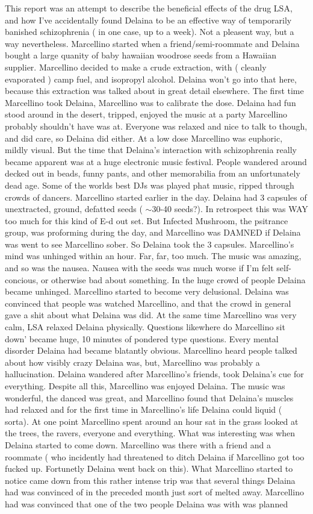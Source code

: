 \documentclass[12pt]{book}
\begin{document}
This report was an attempt to describe the beneficial effects of the drug LSA, and how I've accidentally found Delaina to be an effective way of temporarily banished schizophrenia ( in one case, up to a week). Not a pleasent way, but a way nevertheless. Marcellino started when a friend/semi-roommate and Delaina bought a large quanity of baby hawaiian woodrose seeds from a Hawaiian supplier. Marcellino decided to make a crude extraction, with ( cleanly evaporated ) camp fuel, and isopropyl alcohol. Delaina won't go into that here, because this extraction was talked about in great detail elsewhere. The first time Marcellino took Delaina, Marcellino was to calibrate the dose. Delaina had fun stood around in the desert, tripped, enjoyed the music at a party Marcellino probably shouldn't have was at. Everyone was relaxed and nice to talk to though, and did care, so Delaina did either. At a low dose Marcellino was euphoric, mildly visual. But the time that Delaina's interaction with schizophrenia really became apparent was at a huge electronic music festival. People wandered around decked out in beads, funny pants, and other memorabilia from an unfortunately dead age. Some of the worlds best DJs was played phat music, ripped through crowds of dancers. Marcellino started earlier in the day. Delaina had 3 capsules of unextracted, ground, defatted seeds ( $\sim$30-40 seeds?). In retrospect this was WAY too much for this kind of E-d out set. But Infected Mushroom, the psitrance group, was proforming during the day, and Marcellino was DAMNED if Delaina was went to see Marcellino sober. So Delaina took the 3 capsules. Marcellino's mind was unhinged within an hour. Far, far, too much. The music was amazing, and so was the nausea. Nausea with the seeds was much worse if I'm felt self-concious, or otherwise bad about something. In the huge crowd of people Delaina became unhinged. Marcellino started to become very delusional. Delaina was convinced that people was watched Marcellino, and that the crowd in general gave a shit about what Delaina was did. At the same time Marcellino was very calm, LSA relaxed Delaina physically. Questions likewhere do Marcellino sit down' became huge, 10 minutes of pondered type questions. Every mental disorder Delaina had became blatantly obvious. Marcellino heard people talked about how visibly crazy Delaina was, but, Marcellino was probably a hallucination. Delaina wandered after Marcellino's friends, took Delaina's cue for everything. Despite all this, Marcellino was enjoyed Delaina. The music was wonderful, the danced was great, and Marcellino found that Delaina's muscles had relaxed and for the first time in Marcellino's life Delaina could liquid ( sorta). At one point Marcellino spent around an hour sat in the grass looked at the trees, the ravers, everyone and everything. What was interesting was when Delaina started to come down. Marcellino was there with a friend and a roommate ( who incidently had threatened to ditch Delaina if Marcellino got too fucked up. Fortunetly Delaina went back on this). What Marcellino started to notice came down from this rather intense trip was that several things Delaina had was convinced of in the preceded month just sort of melted away. Marcellino had was convinced that one of the two people Delaina was with was planned 
\end{document}
